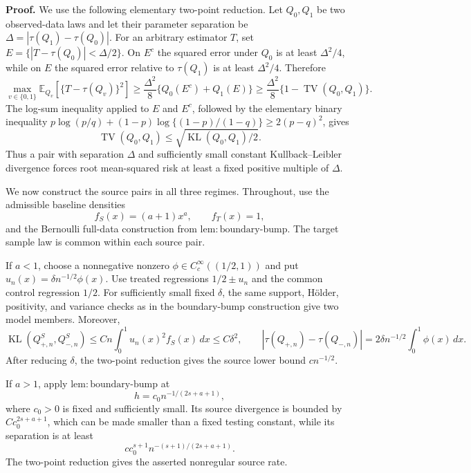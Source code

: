 \textbf{Proof.}
We use the following elementary two-point reduction.  Let \(Q_0,Q_1\) be two observed-data laws and let their parameter separation be \(\Delta=|\tau(Q_1)-\tau(Q_0)|\).  For an arbitrary estimator \(T\), set
\(E=\{|T-\tau(Q_0)|<\Delta/2\}\).  On \(E^c\) the squared error under \(Q_0\) is at least \(\Delta^2/4\), while on \(E\) the squared error relative to \(\tau(Q_1)\) is at least \(\Delta^2/4\).  Therefore
\[
 \max_{v\in\{0,1\}}\mathbb E_{Q_v}
   [\{T-\tau(Q_v)\}^2]
 \ge \frac{\Delta^2}{8}
 \{Q_0(E^c)+Q_1(E)\}
 \ge \frac{\Delta^2}{8}\{1-\operatorname{TV}(Q_0,Q_1)\}.
\]
The log-sum inequality applied to \(E\) and \(E^c\), followed by the elementary binary inequality
\(p\log(p/q)+(1-p)\log\{(1-p)/(1-q)\}\ge2(p-q)^2\), gives
\[
 \operatorname{TV}(Q_0,Q_1)
 \le \sqrt{\operatorname{KL}(Q_0,Q_1)/2}.
\]
Thus a pair with separation \(\Delta\) and sufficiently small constant Kullback--Leibler divergence forces root mean-squared risk at least a fixed positive multiple of \(\Delta\).

We now construct the source pairs in all three regimes.  Throughout, use the admissible baseline densities
\[
 f_S(x)=(a+1)x^a,\qquad f_T(x)=1,
\]
and the Bernoulli full-data construction from \(\mathrm{lem:boundary\text{-}bump}\).  The target sample law is common within each source pair.

If \(a<1\), choose a nonnegative nonzero
\(\phi\in C_c^\infty((1/2,1))\) and put
\(u_n(x)=\delta n^{-1/2}\phi(x)\).  Use treated regressions
\(1/2\pm u_n\) and the common control regression \(1/2\).  For sufficiently small fixed \(\delta\), the same support, H\"older, positivity, and variance checks as in the boundary-bump construction give two model members.  Moreover,
\[
 \operatorname{KL}(Q_{+,n}^S,Q_{-,n}^S)
 \le Cn\int_0^1u_n(x)^2f_S(x)\,dx
 \le C\delta^2,
 \qquad
 |\tau(Q_{+,n})-\tau(Q_{-,n})|
 =2\delta n^{-1/2}\int_0^1\phi(x)\,dx.
\]
After reducing \(\delta\), the two-point reduction gives the source lower bound \(cn^{-1/2}\).

If \(a>1\), apply \(\mathrm{lem:boundary\text{-}bump}\) at
\[
 h=c_0n^{-1/(2s+a+1)},
\]
where \(c_0>0\) is fixed and sufficiently small.  Its source divergence is bounded by
\(Cc_0^{2s+a+1}\), which can be made smaller than a fixed testing constant, while its separation is at least
\[
 cc_0^{s+1}n^{-(s+1)/(2s+a+1)}.
\]
The two-point reduction gives the asserted nonregular source rate.

